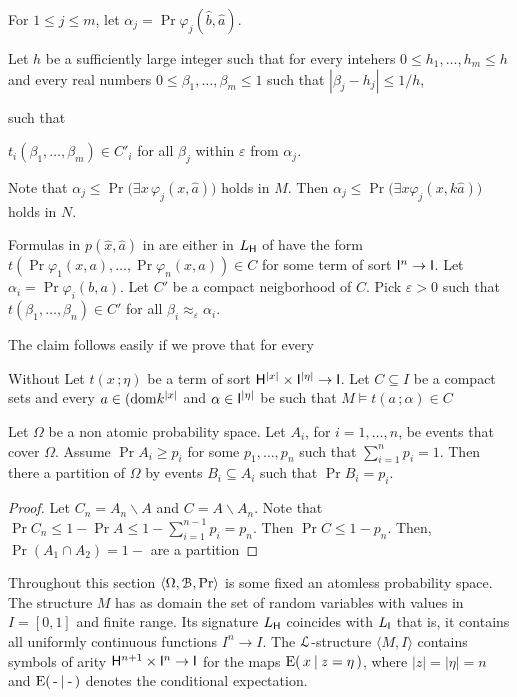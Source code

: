 \documentclass[10pt,oneside]{amsproc}
\begin{document}
For $1\le j\le m$, let $\alpha_j=\Pr\varphi_j(\hat b,\hat a)$.

Let $h$ be a sufficiently large integer such that for every intehers $0\le h_1,\dots,h_m\le h$ and every real numbers $0\le\beta_1,\dots,\beta_m\le 1$ such that $|\beta_j-h_j|\le1/h$,



such that 

$t_i(\beta_1,\dots,\beta_m)\in C'_i$ for all $\beta_j$ within $\varepsilon$ from $\alpha_j$. 

Note that $\alpha_j\le\Pr\big(\exists x\, \varphi_j(x,\hat a)\big)$ holds in $M$.
Then $\alpha_j\le\Pr\big(\exists x \varphi_j(x,k\hat a)\big)$ holds in $N$.


Formulas in $p(\hat x,\hat a)$ in are either in $L_{\sf H}$ of have the form $t(\Pr\varphi_1(x,a),\dots,\Pr\varphi_n(x,a))\in C$ for some term of sort ${\sf I}^n\to{\sf I}$.
Let $\alpha_i=\Pr\varphi_i(b,a)$.
Let $C'$ be a compact neigborhood of $C$.
Pick $\varepsilon>0$ such that $t(\beta_1,\dots,\beta_n)\in C'$ for all $\beta_i\approx_\varepsilon\alpha_i$. 


The claim follows easily if we prove that for every 

Without Let $t(x\,;\eta)$ be a term of sort ${\sf H}^{|x|}\times{\sf I}^{|\eta|}\to{\sf I}$.
Let $C\subseteq I$ be a compact sets and every $a\in({\rm dom} k^{|x|}$ and $\alpha\in{\sf I}^{|\eta|}$ be such that $M\models t(a\,;\alpha)\in C$


\begin{fact}
  Let $\Omega$ be a non atomic probability space.
  Let $A_i$, for $i=1,\dots,n$, be events that cover $\Omega$.
  Assume $\Pr A_i\ge p_i$ for some $p_1,\dots,p_n$ such that $\sum_{i=1}^np_i=1$.
  Then there a partition of $\Omega$ by events $B_i\subseteq A_i$ such that $\Pr B_i= p_i$.
\end{fact}

\begin{proof}
  Let $C_n=A_n\smallsetminus A$ and $C=A\smallsetminus A_n$.
  Note that $\Pr C_n\le1-\Pr A\le 1-\sum_{i=1}^{n-1}p_i=p_n$.
  Then $\Pr C\le 1-p_n$.
  Then, $\Pr(A_1\cap A_2)=1-$ are a partition 

\end{proof}

Throughout this section $\langle\Omega,{\EuScript B},\Pr\rangle$ is some fixed an atomless probability space. 
The structure $M$ has as domain the set of random variables with values in $I=[0,1]$ and finite range.
Its signature $L_{\sf H}$ coincides with $L_{\sf I}$ that is, it contains all uniformly continuous functions $I^n\to I$.
The ${\EuScript L}$-structure $\langle M,I\rangle$ contains symbols of arity ${\sf H}^{n+1}\times{\sf I}^n\to{\sf I}$ for the maps  
${\rm E}(\,x\mathbin|z=\eta\,)$, where $|z|=|\eta|=n$ and ${\rm E(\,\mbox-\mathbin|\mbox-\,)}$ denotes the conditional expectation.
\end{document}

